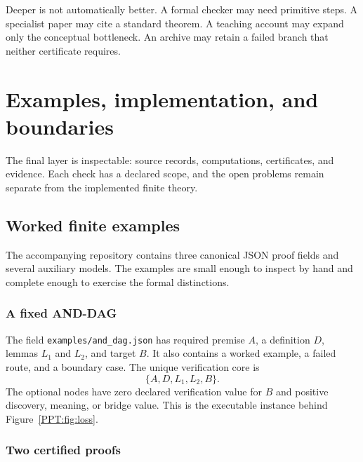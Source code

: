 Deeper is not automatically better. A formal checker may need primitive steps. A specialist paper may cite a standard theorem. A teaching account may expand only the conceptual bottleneck. An archive may retain a failed branch that neither certificate requires.



\chapter{Examples, implementation, and boundaries}\label{PPT:book:chapter-54}
The final layer is inspectable: source records, computations, certificates, and evidence. Each check has a declared scope, and the open problems remain separate from the implemented finite theory.

 


\section{Worked finite examples}
\label{PPT:sec:old20}

The accompanying repository contains three canonical JSON proof fields and several auxiliary models. The examples are small enough to inspect by hand and complete enough to exercise the formal distinctions.

\subsection{A fixed AND-DAG}

The field \texttt{examples/and\_dag.json} has required premise $A$, a definition $D$, lemmas $L_1$ and $L_2$, and target $B$. It also contains a worked example, a failed route, and a boundary case. The unique verification core is
\[
\{A,D,L_1,L_2,B\}.
\]
The optional nodes have zero declared verification value for $B$ and positive discovery, meaning, or bridge value. This is the executable instance behind Figure~\ref{PPT:fig:loss}.

\subsection{Two certified proofs}

